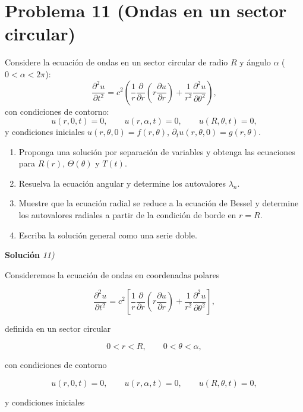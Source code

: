 \documentclass[12pt]{article}
\begin{document}
\section*{Problema 11 (Ondas en un sector circular)}
Considere la ecuación de ondas en un sector circular de radio \(R\) y ángulo \(\alpha\) (\(0 < \alpha < 2\pi\)):
\[
\frac{\partial^2 u}{\partial t^2} = c^2 \left( \frac{1}{r} \frac{\partial}{\partial r} \left( r \frac{\partial u}{\partial r} \right) + \frac{1}{r^2} \frac{\partial^2 u}{\partial \theta^2} \right),
\]
con condiciones de contorno:
\[
u(r, 0, t) = 0, \qquad u(r, \alpha, t) = 0, \qquad u(R, \theta, t) = 0,
\]
y condiciones iniciales \(u(r, \theta, 0) = f(r, \theta)\), \(\partial_t u(r, \theta, 0) = g(r, \theta)\).
\begin{enumerate}
    \item[(a)] Proponga una solución por separación de variables y obtenga las ecuaciones para \(R(r)\), \(\Theta(\theta)\) y \(T(t)\).
    \item[(b)] Resuelva la ecuación angular y determine los autovalores \(\lambda_n\).
    \item[(c)] Muestre que la ecuación radial se reduce a la ecuación de Bessel y determine los autovalores radiales a partir de la condición de borde en \(r = R\).
    \item[(d)] Escriba la solución general como una serie doble.
\end{enumerate}

\vspace{0.5cm}
{\bf Soluci\'on }{\em 11)}
\vspace{0.5cm}

Consideremos la ecuación de ondas en coordenadas polares

\begin{equation}
\frac{\partial^2u}{\partial t^2}
=
c^2
\left[
\frac{1}{r}\frac{\partial}{\partial r}
\left(
r\frac{\partial u}{\partial r}
\right)
+
\frac{1}{r^2}
\frac{\partial^2u}{\partial\theta^2}
\right],
\end{equation}

definida en un sector circular

\[
0<r<R,
\qquad
0<\theta<\alpha,
\]

con condiciones de contorno

\begin{equation}
u(r,0,t)=0,
\qquad
u(r,\alpha,t)=0,
\qquad
u(R,\theta,t)=0,
\end{equation}

y condiciones iniciales
\end{document}
